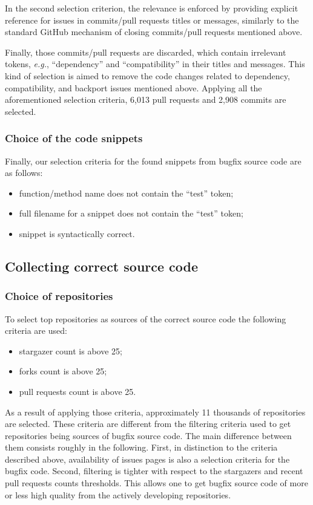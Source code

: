 \documentclass[10pt,conference]{IEEEtran}
\begin{document}
In the second selection criterion, the relevance is enforced by providing explicit reference
for issues in commits/pull requests titles or messages, similarly to the standard GitHub mechanism of closing commits/pull requests mentioned above.

Finally, those commits/pull requests are discarded, which contain irrelevant tokens, \textit{e.g.}, ``dependency'' and ``compatibility'' in their titles and messages.
This kind of selection is aimed to remove the code changes related to dependency, compatibility, and backport issues mentioned above.
Applying all the aforementioned selection criteria, 6,013 pull requests and 2,908 commits are selected.

\subsubsection{Choice of the code snippets}\label{h_report_1}


Finally, our selection criteria for the found snippets from bugfix source code are as follows:
\begin{itemize}
\item function/method name does not contain the ``test'' token;

\item full filename for a snippet does not contain the ``test'' token;

\item snippet is syntactically correct.
\end{itemize}

\subsection{Collecting correct source code}

\subsubsection{Choice of repositories}

To select top repositories as sources of the correct source code the following criteria are used: 
\begin{itemize}
\item stargazer count is above 25;

\item forks count is above 25;

\item pull requests count is above 25.
\end{itemize}
As a result of applying those criteria, approximately 11 thousands of repositories are selected.
These criteria are different from the filtering criteria used to get repositories being sources of bugfix source code.
The main difference between them consists roughly in the following. First, in distinction to the criteria described above,
availability of issues pages is also a selection criteria for the bugfix code.
Second, filtering is tighter with respect to the stargazers and recent pull requests counts thresholds. This allows one to get
bugfix source code of more or less high quality from the actively developing repositories.
\end{document}
